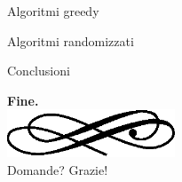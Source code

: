 	\begin{frame}{Algoritmi greedy}
	\end{frame}
	
	\begin{frame}{Algoritmi randomizzati}
	\end{frame}
	
	\begin{frame}{Conclusioni}
	\end{frame}
	
	\begin{frame}
		\begin{center}
			\textbf{\calligra\Huge Fine.}\\
			\includegraphics[width=5cm]{img/ornament.eps}\\[1cm]
			\pause
			{\huge\calligra Domande?\pause{} Grazie!}
		\end{center}
	\end{frame}

